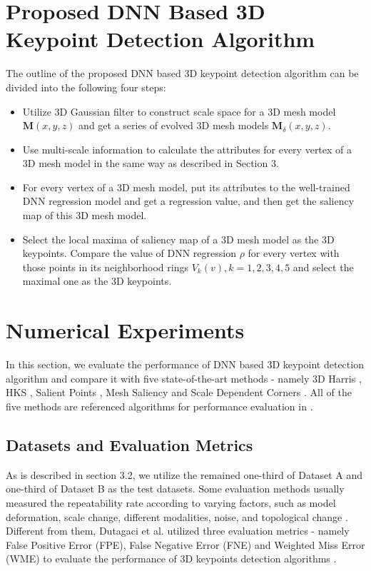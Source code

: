 \documentclass[runningheads]{article}
\begin{document}
\section{Proposed DNN Based 3D Keypoint Detection Algorithm}
The outline of the proposed DNN based 3D keypoint detection algorithm can be divided into the following four steps:
\begin{itemize}
	\item Utilize 3D Gaussian filter to construct scale space for a 3D mesh model \emph{$\bm{M}(x,y,z)$} and get a series of evolved 3D mesh models \emph{$\bm{M}_\delta(x,y,z)$}.
	\item Use multi-scale information to calculate the attributes for every vertex of a 3D mesh model in the same way as described in Section 3.
	\item For every vertex of a 3D mesh model, put its attributes to the well-trained DNN regression model and get a regression value, and then get the saliency map of this 3D mesh model.
	\item Select the local maxima of saliency map of a 3D mesh model as the 3D keypoints. Compare the value of DNN regression \emph{$\rho$}  for every vertex with those points in its neighborhood rings \emph{$V_k(v),k=1,2,3,4,5$} and select the maximal one as the 3D keypoints. 
\end{itemize}


\section{Numerical Experiments}

In this section, we evaluate the performance of DNN based 3D keypoint detection algorithm and compare it with five state-of-the-art methods - namely 3D Harris \cite{3Dharris2011harris}, HKS \cite{sun2009concise}, Salient Points \cite{castellani2008sparse}, Mesh Saliency \cite{Meshsaliency2005mesh} and Scale Dependent Corners \cite{novatnack2007scale}. All of the five methods are referenced algorithms for performance evaluation in \cite{song20133d,randomforest20143d,dutagaci2012evaluation}.

\subsection{Datasets and Evaluation Metrics}

As is described in section 3.2, we utilize the remained one-third of Dataset A and one-third of Dataset B as the test datasets. Some evaluation methods usually measured the repeatability rate according to varying factors, such as model deformation, scale change, different modalities, noise, and topological change \cite{tombari2013performance}. Different from them, Dutagaci et al. utilized three evaluation metrics - namely False Positive Error (FPE), False Negative Error (FNE) and Weighted Miss Error (WME) to evaluate the performance of 3D keypoints detection algorithms \cite{dutagaci2012evaluation}.
\end{document}
